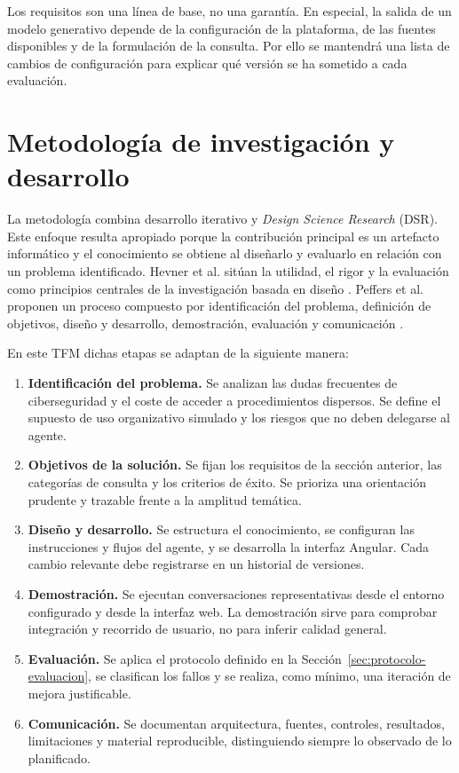 \documentclass[12pt,twoside,titlepage]{book}
\begin{document}
Los requisitos son una línea de base, no una garantía. En especial, la salida de
un modelo generativo depende de la configuración de la plataforma, de las fuentes
disponibles y de la formulación de la consulta. Por ello se mantendrá una lista
de cambios de configuración para explicar qué versión se ha sometido a cada
evaluación.

\section{Metodología de investigación y desarrollo}
\label{sec:metodologia}

La metodología combina desarrollo iterativo y \emph{Design Science Research}
(DSR). Este enfoque resulta apropiado porque la contribución principal es un
artefacto informático y el conocimiento se obtiene al diseñarlo y evaluarlo en
relación con un problema identificado. Hevner et al. sitúan la utilidad, el
rigor y la evaluación como principios centrales de la investigación basada en
diseño \cite{hevner2004}. Peffers et al. proponen un proceso compuesto por
identificación del problema, definición de objetivos, diseño y desarrollo,
demostración, evaluación y comunicación \cite{peffers2007}.

En este TFM dichas etapas se adaptan de la siguiente manera:

\begin{enumerate}
  \item \textbf{Identificación del problema.} Se analizan las dudas frecuentes
  de ciberseguridad y el coste de acceder a procedimientos dispersos. Se define
  el supuesto de uso organizativo simulado y los riesgos que no deben delegarse
  al agente.
  \item \textbf{Objetivos de la solución.} Se fijan los requisitos de la
  sección anterior, las categorías de consulta y los criterios de éxito. Se
  prioriza una orientación prudente y trazable frente a la amplitud temática.
  \item \textbf{Diseño y desarrollo.} Se estructura el conocimiento, se
  configuran las instrucciones y flujos del agente, y se desarrolla la interfaz
  Angular. Cada cambio relevante debe registrarse en un historial de versiones.
  \item \textbf{Demostración.} Se ejecutan conversaciones representativas desde
  el entorno configurado y desde la interfaz web. La demostración sirve para
  comprobar integración y recorrido de usuario, no para inferir calidad general.
  \item \textbf{Evaluación.} Se aplica el protocolo definido en la
  Sección~\ref{sec:protocolo-evaluacion}, se clasifican los fallos y se realiza,
  como mínimo, una iteración de mejora justificable.
  \item \textbf{Comunicación.} Se documentan arquitectura, fuentes, controles,
  resultados, limitaciones y material reproducible, distinguiendo siempre lo
  observado de lo planificado.
\end{enumerate}
\end{document}
